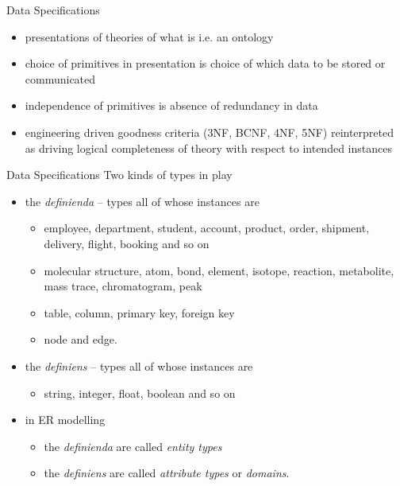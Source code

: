 \documentclass[xcolor=pst,dvips]{beamer}   %
\begin{document}
\begin{frame}{Data Specifications}
\begin{itemize}
\item presentations of theories of what is i.e. an ontology
\item choice of primitives in presentation is choice of which data to be stored or communicated
\item independence of primitives is absence of redundancy in data 
\item engineering driven goodness criteria (3NF, BCNF, 4NF, 5NF) reinterpreted as driving logical completeness of theory with respect to intended instances
\end{itemize}
\end{frame}

\begin{frame}{Data Specifications}
Two kinds of types in play
\begin{itemize}
\item  the \textit{definienda} -- types all of whose instances are 
\begin{itemize}
\item employee, department, student, account, product, order, shipment, delivery, flight, booking and so on
\item molecular structure, atom, bond, element, isotope, reaction, metabolite, mass trace, chromatogram, peak
\item table, column, primary key, foreign key
\item node and edge. 
\end{itemize}
\pause 
\item  the \textit{definiens}  -- types all of whose instances are 
\begin{itemize}
       \item string, integer, float, boolean and so on
\end{itemize}
\end{itemize}
\pause
\begin{itemize}
\item in ER modelling 
\begin{itemize}
\item the \textit{definienda} are called \textit{entity types}
\item the \textit{definiens} are called \textit{attribute types} or \textit{domains}.
\end{itemize}
\end{itemize}
\end{frame}
\end{document}
